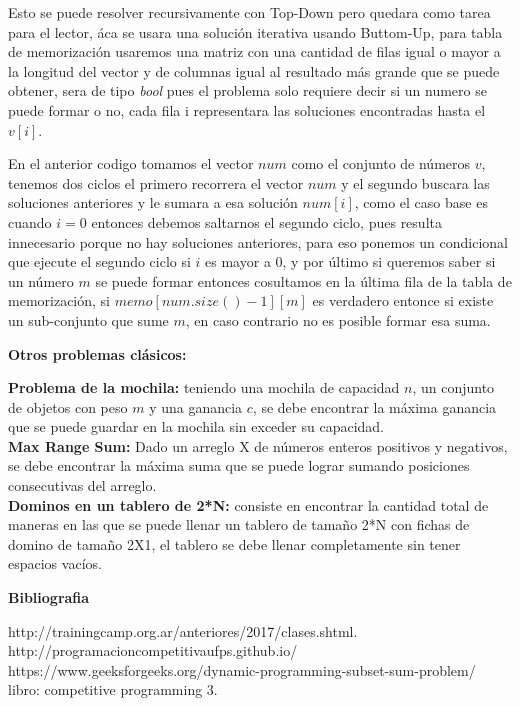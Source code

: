 \documentclass[12pt, a4paper]{article}
\newcommand\cppfile[2][]{

}
\newcommand{\subtitulo}[1]{\begin{center}\textbf{#1}\end{center}}
\begin{document}
	Esto se puede resolver recursivamente con Top-Down pero quedara como tarea para el lector, áca se usara una solución
	iterativa usando Buttom-Up, para tabla de memorización usaremos una matriz con una cantidad de filas igual o mayor
	a la longitud del vector y de columnas igual al resultado más grande que se puede obtener, sera de tipo \textit{bool}
	pues el problema solo requiere decir si un numero se puede formar o no, cada fila i representara las soluciones
	encontradas hasta el $v[i]$.
	\cppfile[8-24]{codigos/SubSetSum.cpp}
	En el anterior codigo tomamos el vector $num$ como el conjunto de números $v$, tenemos dos ciclos el primero
	recorrera el vector $num$ y el segundo buscara las soluciones anteriores y le sumara a esa solución $num[i]$,
	como el caso base es cuando $i=0$ entonces debemos saltarnos el segundo ciclo, pues resulta innecesario
	porque no hay soluciones anteriores, para eso ponemos un condicional que ejecute el segundo ciclo si
	$i$ es mayor a 0, y por último si queremos saber si un número $m$ se puede formar entonces cosultamos en
	la última fila de la tabla de memorización, si $memo[num.size()-1][m]$ es verdadero entonce si existe un 
	sub-conjunto que sume $m$,
	en caso contrario no es posible formar esa suma.

	
	\subtitulo{Otros problemas clásicos:}
	
	\textbf{Problema de la mochila:} teniendo una mochila de capacidad $n$, un conjunto de objetos con peso $m$ 
	y una ganancia $c$, se debe encontrar la máxima ganancia que se puede guardar en la mochila sin
	exceder su capacidad.\\
	
	\textbf{Max Range Sum:} Dado un arreglo X de números enteros positivos y negativos, se debe encontrar la
	máxima suma que se puede lograr sumando posiciones consecutivas del arreglo.\\
	
	\textbf{Dominos en un tablero de 2*N:} consiste en encontrar la cantidad total de maneras en las que se puede
	llenar un tablero de tamaño 2*N con fichas de domino de tamaño 2X1, el tablero se debe llenar completamente sin
	tener espacios vacíos.
	
	\subtitulo{Bibliografia}
http://trainingcamp.org.ar/anteriores/2017/clases.shtml.\\
http://programacioncompetitivaufps.github.io/\\
https://www.geeksforgeeks.org/dynamic-programming-subset-sum-problem/\\
libro: competitive programming 3.\\
\end{document}
